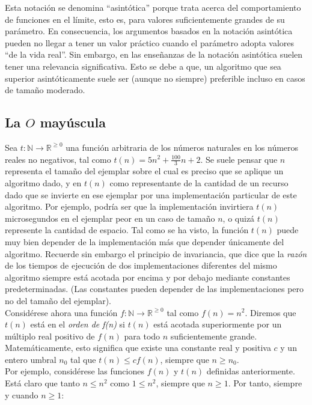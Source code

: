 Esta notación se denomina ``asintótica'' porque trata acerca del comportamiento de funciones en el límite, esto es, para valores suficientemente grandes de su parámetro. En consecuencia, los argumentos basados en la notación asintótica pueden no llegar a tener un valor práctico cuando el parámetro adopta valores ``de la vida real''. Sin embargo, en las enseñanzas de la notación asintótica suelen tener una relevancia significativa. Esto se debe a que, un algoritmo que sea superior asintóticamente suele ser (aunque no siempre) preferible incluso en casos de tamaño moderado.\\

\subsection{La $O$ mayúscula}

Sea $t: \mathbb{N} \rightarrow \mathbb{R}^{\geq 0}$ una función arbitraria de los números naturales en los números reales no negativos, tal como $t(n) = 5n^2 + \frac{100}{3}n + 2$. Se suele pensar que $n$ representa el tamaño del ejemplar sobre el cual es preciso que se aplique un algoritmo dado, y en $t(n)$ como representante de la cantidad de un recurso dado que se invierte en ese ejemplar por una implementación particular de este algoritmo. Por ejemplo, podría ser que la implementación invirtiera $t(n)$ microsegundos en el ejemplar peor en un caso de tamaño $n$, o quizá $t(n)$ represente la cantidad de espacio. Tal como se ha visto, la función $t(n)$ puede muy bien depender de la implementación más que depender únicamente del algoritmo. Recuerde sin embargo el principio de invariancia, que dice que la \emph{razón} de los tiempos de ejecución de dos implementaciones diferentes del mismo algoritmo siempre está acotada por encima y por debajo mediante constantes predeterminadas. (Las constantes pueden depender de las implementaciones pero no del tamaño del ejemplar).\\

Considérese ahora una función $f: \mathbb{N} \rightarrow \mathbb{R}^{\geq 0}$ tal como $f(n) = n^2$. Diremos que $t(n)$ está en el \emph{orden de f(n)} si $t(n)$ está acotada superiormente por un múltiplo real positivo de $f(n)$ para todo $n$ suficientemente grande. Matemáticamente, esto significa que existe una constante real y positiva $c$ y un entero umbral $n_0$ tal que $t(n) \leq cf(n)$, siempre que $n \geq n_0$.\\

Por ejemplo, considérese las funciones $f(n)$ y $t(n)$ definidas anteriormente. Está claro que tanto $n \leq n^2$ como $1 \leq n^2$, siempre que $n \geq 1$. Por tanto, siempre y cuando $n \geq 1$:

